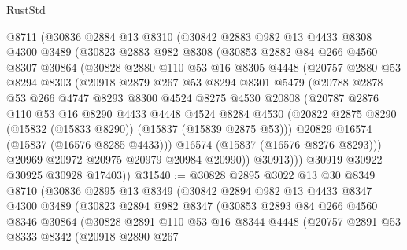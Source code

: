 \begin{lexlean}{RustStd}
\begin{coremodule}
{\begin{coremodule}
{{{{{{{{{{{{{{{{{{{{{{{{{{{{{{{{{{{{{{{{{{{{{{{{{{{{{{{{{{{{    @8711
    (@30836
      @2884
      @13
      @8310
      (@30842
        @2883
        @982
        @13
        @4433
        @8308
        @4300
        @3489
        (@30823
          @2883
          @982
          @8308
          (@30853
            @2882
            @84
            @266
            @4560
            @8307
            @30864
            (@30828
              @2880
              @110
              @53
              @16
              @8305
              @4448
              (@20757
                @2880
                @53
                @8294
                @8303
                (@20918
                  @2879
                  @267
                  @53
                  @8294
                  @8301
                  @5479
                  (@20788
                    @2878
                    @53
                    @266
                    @4747
                    @8293
                    @8300
                    @4524
                    @8275
                    @4530
                    @20808
                    (@20787
                      @2876
                      @110
                      @53
                      @16
                      @8290
                      @4433
                      @4448
                      @4524
                      @8284
                      @4530
                      (@20822 @2875 @8290 (@15832 (@15833 @8290)) (@15837 (@15839 @2875 @53)))
                      @20829
                      @16574
                      (@15837 (@16576 @8285 @4433)))
                    @16574
                    (@15837 (@16576 @8276 @8293)))
                  @20969
                  @20972
                  @20975
                  @20979
                  @20984
                  @20990))
              @30913)))
        @30919
        @30922
        @30925
        @30928
        @17403))
@31540 := @30828
    @2895
    @3022
    @13
    @30
    @8349
    @8710
    (@30836
      @2895
      @13
      @8349
      (@30842
        @2894
        @982
        @13
        @4433
        @8347
        @4300
        @3489
        (@30823
          @2894
          @982
          @8347
          (@30853
            @2893
            @84
            @266
            @4560
            @8346
            @30864
            (@30828
              @2891
              @110
              @53
              @16
              @8344
              @4448
              (@20757
                @2891
                @53
                @8333
                @8342
                (@20918
                  @2890
                  @267
}}}}}}}}}}}}}}}}}}}}}}}}}}}}}}}}}}}}}}}}}}}}}}}}}}}}}}}}}}}}
\end{coremodule}}
\end{coremodule}
\end{lexlean}
